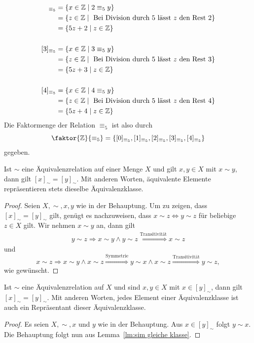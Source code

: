 \begin{bsp}
\begin{align*}
    [2]_{\equiv_5}&=\{x\in \Z\mid 2\equiv_5y \}\\ &=\{z\in\Z\mid \text{ Bei Division durch }5\text{ lässt }z\text{ den Rest }2 \}\\
    &=\{5z+2\mid z\in\Z\}\\
    \phantom{dd}\\
    [3]_{\equiv_5}&=\{x\in \Z\mid 3\equiv_5y \}\\ &=\{z\in\Z\mid \text{ Bei Division durch }5\text{ lässt }z\text{ den Rest }3 \}\\
    &=\{5z+3\mid z\in\Z\}\\
    \phantom{dd}\\
    [4]_{\equiv_5}&=\{x\in \Z\mid 4\equiv_5y \}\\ &=\{z\in\Z\mid \text{ Bei Division durch }5\text{ lässt }z\text{ den Rest }4 \}\\
    &=\{5z+4\mid z\in\Z\}
    \end{align*}
    Die Faktormenge der Relation $\equiv_5$ ist also durch
    \[
    \faktor{\Z}{\equiv_5}=\{ [0]_{\equiv_5},[1]_{\equiv_5},[2]_{\equiv_5},[3]_{\equiv_5},[4]_{\equiv_5} \}
    \]
    gegeben.
    \end{bsp}
    \begin{lm}\label{lm:sim gleiche klasse}
    Ist $\sim $ eine Äquivalenzrelation auf einer Menge $X$ und gilt $x,y\in X$ mit $x\sim y$, dann gilt $[x]_\sim=[y]_\sim$. Mit anderen Worten, äquivalente Elemente repräsentieren stets dieselbe Äquivalenzklasse.
    \end{lm}
    \begin{proof}
    Seien $X,\sim,x,y$ wie in der Behauptung. Um zu zeigen, dass $[x]_\sim=[y]_\sim$ gilt, genügt es nachzuweisen, dass $x\sim z\Leftrightarrow y\sim z$ für beliebige $z\in X$ gilt. Wir nehmen $x\sim y$ an, dann gilt
    \begin{align*}
    y\sim z\Rightarrow x\sim y\land y\sim z \stackrel{\text{Transitivität}}{\Longrightarrow} x\sim z
    \end{align*}
    und
    \[
    x\sim z\Rightarrow x\sim y\land x\sim z\stackrel{\text{Symmetrie}}{\Longrightarrow} y\sim x\land x\sim z\stackrel{\text{Transitivität}}{\Longrightarrow} y\sim z,
    \]
    wie gewünscht.
    \end{proof}
    \begin{cor}\label{cor:alle Elemente Repräsentanten}
    Ist $\sim $ eine Äquivalenzrelation auf $X$ und sind $x,y\in X$ mit $x\in[y]_\sim$, dann gilt $[x]_\sim=[y]_\sim$. Mit anderen Worten, jedes Element einer Äquivalenzklasse ist auch ein Repräsentant dieser Äquivalenzklasse.
    \end{cor}
    \begin{proof}
    Es seien $X,\sim,x$ und $y$ wie in der Behauptung. Aus $x\in[y]_\sim$ folgt $y\sim x$. Die Behauptung folgt nun aus Lemma~\ref{lm:sim gleiche klasse}.
    \end{proof}

